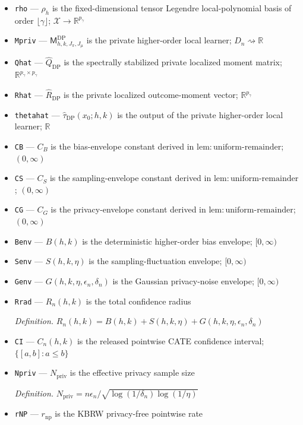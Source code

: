 \documentclass{article}
\begin{document}
\begin{itemize}
  \item \texttt{rho} --- \(\rho_h\) is the fixed-dimensional tensor Legendre local-polynomial basis of order \(\lfloor\gamma\rfloor\); \(\mathcal X\to\mathbb R^{p_\gamma}\)
  \item \texttt{Mpriv} --- \(\mathsf M_{h,k,J_\pi,J_\mu}^{\mathrm{DP}}\) is the private higher-order local learner; \(D_n\rightsquigarrow\mathbb R\)
  \item \texttt{Qhat} --- \(\widehat Q_{\mathrm{DP}}\) is the spectrally stabilized private localized moment matrix; \(\mathbb R^{p_\gamma\times p_\gamma}\)
  \item \texttt{Rhat} --- \(\widehat R_{\mathrm{DP}}\) is the private localized outcome-moment vector; \(\mathbb R^{p_\gamma}\)
  \item \texttt{thetahat} --- \(\widehat\tau_{\mathrm{DP}}(x_0;h,k)\) is the output of the private higher-order local learner; \(\mathbb R\)
  \item \texttt{CB} --- \(C_B\) is the bias-envelope constant derived in \(\mathrm{lem{:}uniform\text{-}remainder}\); \((0,\infty)\)
  \item \texttt{CS} --- \(C_S\) is the sampling-envelope constant derived in \(\mathrm{lem{:}uniform\text{-}remainder}\); \((0,\infty)\)
  \item \texttt{CG} --- \(C_G\) is the privacy-envelope constant derived in \(\mathrm{lem{:}uniform\text{-}remainder}\); \((0,\infty)\)
  \item \texttt{Benv} --- \(B(h,k)\) is the deterministic higher-order bias envelope; \([0,\infty)\)
  \item \texttt{Senv} --- \(S(h,k,\eta)\) is the sampling-fluctuation envelope; \([0,\infty)\)
  \item \texttt{Genv} --- \(G(h,k,\eta,\epsilon_n,\delta_n)\) is the Gaussian privacy-noise envelope; \([0,\infty)\)
  \item \texttt{Rrad} --- \(R_n(h,k)\) is the total confidence radius
  \par\smallskip\noindent\emph{Definition.} \(R_n(h,k)=B(h,k)+S(h,k,\eta)+G(h,k,\eta,\epsilon_n,\delta_n)\)
  \item \texttt{CI} --- \(C_n(h,k)\) is the released pointwise CATE confidence interval; \(\{[a,b]:a\le b\}\)
  \item \texttt{Npriv} --- \(N_{\mathrm{priv}}\) is the effective privacy sample size
  \par\smallskip\noindent\emph{Definition.} \(N_{\mathrm{priv}}=n\epsilon_n/\sqrt{\log(1/\delta_n)\log(1/\eta)}\)
  \item \texttt{rNP} --- \(r_{\mathrm{np}}\) is the KBRW privacy-free pointwise rate

\end{itemize}
\end{document}

